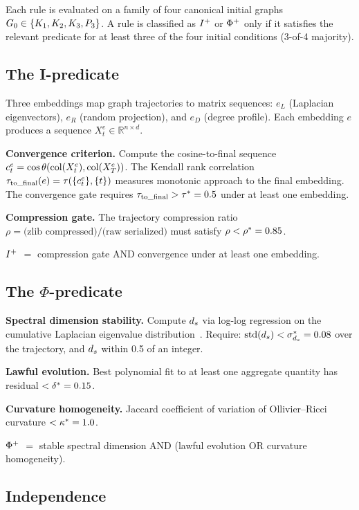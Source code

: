 \documentclass{../shared/primo}
\begin{document}
Each rule is evaluated on a family of four canonical initial graphs $G_0 \in \{K_{1}, K_{2}, K_{3}, P_{3}\}$. A rule is classified as $I\textsuperscript{+}$ or $\Phi\textsuperscript{+}$ only if it satisfies the relevant predicate for at least three of the four initial conditions (3-of-4 majority).

\subsection{The I-predicate}

Three embeddings map graph trajectories to matrix sequences: $e_L$ (Laplacian eigenvectors), $e_R$ (random projection), and $e_D$ (degree profile). Each embedding $e$ produces a sequence $X_t^e \in \mathbb{R}^{n \times d}$.

\textbf{Convergence criterion.} Compute the cosine-to-final sequence $c_t^e = \cos\theta(\operatorname{col}(X_t^e), \operatorname{col}(X_T^e))$. The Kendall rank correlation $\tau_{\mathrm{to\_final}}(e) = \tau(\{c_t^e\}, \{t\})$ measures monotonic approach to the final embedding. The convergence gate requires $\tau_{\mathrm{to\_final}} > \tau^* = 0.5$ under at least one embedding.

\textbf{Compression gate.} The trajectory compression ratio $\rho = \text{(zlib compressed)} / \text{(raw serialized)}$ must satisfy $\rho < \rho^* = 0.85$.

\textbf{$I\textsuperscript{+}$} $=$ compression gate AND convergence under at least one embedding.

\subsection{The $\Phi$-predicate}

\textbf{Spectral dimension stability.} Compute $d_s$ via log-log regression on the cumulative Laplacian eigenvalue distribution~\cite{kowalczyk2026predicates}. Require: $\mathrm{std}(d_s) < \sigma^*_{d_s} = 0.08$ over the trajectory, and $d_s$ within 0.5 of an integer.

\textbf{Lawful evolution.} Best polynomial fit to at least one aggregate quantity has residual $< \delta^* = 0.15$.

\textbf{Curvature homogeneity.} Jaccard coefficient of variation of Ollivier--Ricci curvature $< \kappa^* = 1.0$.

\textbf{$\Phi\textsuperscript{+}$} $=$ stable spectral dimension AND (lawful evolution OR curvature homogeneity).

\subsection{Independence}
\end{document}
